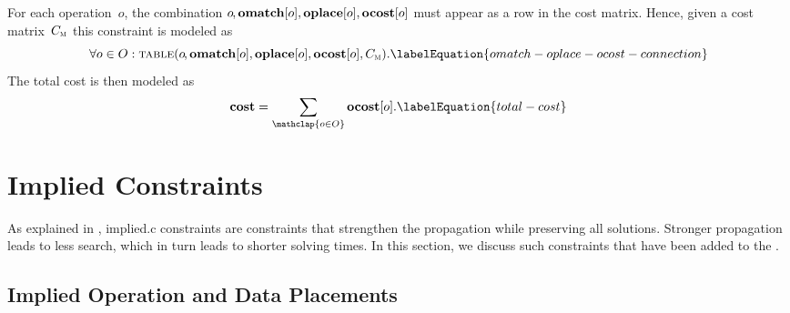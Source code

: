For each \gls{operation}~$o$\hspace{-.8pt}, the combination
\mbox{$o\hspace{-.8pt}, \mVar{omatch}[o], \mVar{oplace}[o], \mVar{ocost}[o]$}
must appear as a row in the cost matrix.
%
Hence, given a cost matrix~$C_{\textsc{m}}$ this \gls{constraint} is modeled as
%
\begin{equation}
  \forall o \in \mOpSet :
  \mTable(
    o\hspace{-1pt},
    \mVar{omatch}[o],
    \mVar{oplace}[o],
    \mVar{ocost}[o],
    \mCostMatrix
  ).
  \labelEquation{omatch-oplace-ocost-connection}
\end{equation}
%
The total cost is then modeled as
%
\begin{equation}
  \mVar{cost} = \sum_{\mathclap{o \in \mOpSet}} \mVar{ocost}[o].
  \labelEquation{total-cost}
\end{equation}


\section{Implied Constraints}

As explained in , \gls{implied.c}
\glspl{constraint} are \glspl{constraint} that strengthen the \gls{propagation}
while preserving all \glspl{solution}.
%
Stronger \gls{propagation} leads to less \gls{search}, which in turn leads to
shorter solving times.
%
In this section, we discuss such \glspl{constraint} that have been added to the
.


\subsection{Implied Operation and Data Placements}

